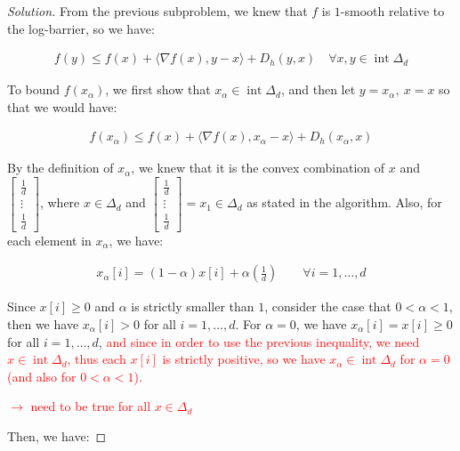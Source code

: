 \documentclass{article}
\newenvironment{solution}
  {\renewcommand\qedsymbol{$\blacksquare$}\begin{proof}[Solution]}
  {\end{proof}}
\DeclareMathOperator{\interior}{int}
\begin{document}
\begin{solution}
From the previous subproblem, we knew that $f$ is $1$-smooth relative to the log-barrier, so we have:

\begin{align*}
    f(y) \leq f(x) + \langle \nabla f(x), y - x \rangle + D_h(y, x) \quad \forall x, y \in \interior \Delta_d
\end{align*}

To bound $f(x_\alpha)$, we first show that $x_\alpha \in \interior \Delta_d$, 
and then let $y = x_\alpha, \ x = x$ so that we would have:

\begin{align*}
    f(x_\alpha) \leq f(x) + \langle \nabla f(x), x_\alpha - x \rangle + D_h(x_\alpha, x)
\end{align*}

By the definition of $x_\alpha$, we knew that it is the convex combination of $x$ and $\begin{bmatrix}
    \frac{1}{d} \\
    \vdots \\
    \frac{1}{d}
\end{bmatrix}$, 
where $x \in \Delta_d$ and $\begin{bmatrix}
    \frac{1}{d} \\
    \vdots \\
    \frac{1}{d}
\end{bmatrix} = x_1 \in \Delta_d$ as stated in the algorithm.
\bigskip
Also, for each element in $x_\alpha$, we have:

\begin{align*}
    x_\alpha[i] = (1 - \alpha) x[i] + \alpha \left( \frac{1}{d} \right) \qquad \forall i = 1, \dots, d
\end{align*}

Since $x[i] \geq 0$ and $\alpha$ is strictly smaller than $1$,
consider the case that $0 < \alpha < 1$, then we have $x_\alpha[i] > 0$ for all $i = 1, \dots, d$.
For $\alpha = 0$, we have $x_\alpha[i] = x[i] \geq 0$ for all $i = 1, \dots, d$,
\textcolor{red}{and since in order to use the previous inequality, we need $x \in \interior \Delta_d$,
thus each $x[i]$ is strictly positive, so we have $x_\alpha \in \interior \Delta_d$ 
for $\alpha = 0$ (and also for $0 < \alpha < 1$).
}
\bigskip

\textcolor{red}{
$\rightarrow$ need to be true for all $x \in \Delta_d$
}


\bigskip

Then, we have:


\end{solution}
\end{document}
